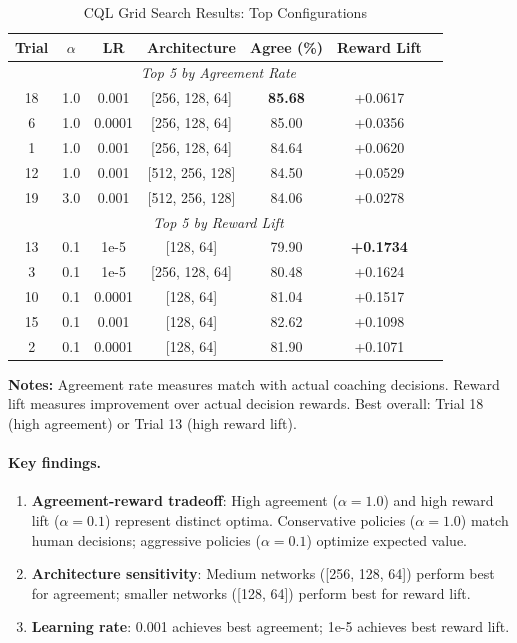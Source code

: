 

\begin{table}[h]
\centering
\caption{CQL Grid Search Results: Top Configurations}
\label{tab:cql-grid-search}
\begin{tabular}{@{}ccccccc@{}}
\toprule
\textbf{Trial} & \textbf{$\alpha$} & \textbf{LR} & \textbf{Architecture} & \textbf{Agree (\%)} & \textbf{Reward Lift} \\
\midrule
\multicolumn{6}{c}{\textit{Top 5 by Agreement Rate}} \\
\midrule
18 & 1.0 & 0.001 & [256, 128, 64] & \textbf{85.68} & +0.0617 \\
6 & 1.0 & 0.0001 & [256, 128, 64] & 85.00 & +0.0356 \\
1 & 1.0 & 0.001 & [256, 128, 64] & 84.64 & +0.0620 \\
12 & 1.0 & 0.001 & [512, 256, 128] & 84.50 & +0.0529 \\
19 & 3.0 & 0.001 & [512, 256, 128] & 84.06 & +0.0278 \\
\midrule
\multicolumn{6}{c}{\textit{Top 5 by Reward Lift}} \\
\midrule
13 & 0.1 & 1e-5 & [128, 64] & 79.90 & \textbf{+0.1734} \\
3 & 0.1 & 1e-5 & [256, 128, 64] & 80.48 & +0.1624 \\
10 & 0.1 & 0.0001 & [128, 64] & 81.04 & +0.1517 \\
15 & 0.1 & 0.001 & [128, 64] & 82.62 & +0.1098 \\
2 & 0.1 & 0.0001 & [128, 64] & 81.90 & +0.1071 \\
\bottomrule
\end{tabular}
\begin{tablenotes}
\small
\item \textbf{Notes:} Agreement rate measures match with actual coaching decisions. Reward lift measures improvement over actual decision rewards. Best overall: Trial 18 (high agreement) or Trial 13 (high reward lift).
\end{tablenotes}
\end{table}

\paragraph{Key findings.}
\begin{enumerate}
    \item \textbf{Agreement-reward tradeoff}: High agreement ($\alpha=1.0$) and high reward lift ($\alpha=0.1$) represent distinct optima. Conservative policies ($\alpha=1.0$) match human decisions; aggressive policies ($\alpha=0.1$) optimize expected value.
    \item \textbf{Architecture sensitivity}: Medium networks ([256, 128, 64]) perform best for agreement; smaller networks ([128, 64]) perform best for reward lift.
    \item \textbf{Learning rate}: 0.001 achieves best agreement; 1e-5 achieves best reward lift.
\end{enumerate}

